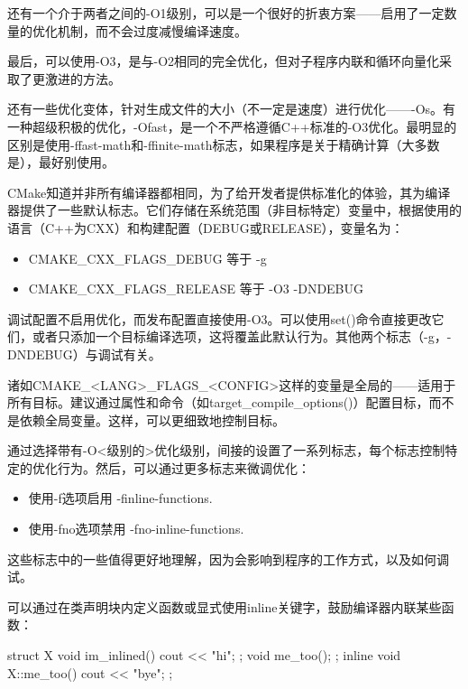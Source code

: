 还有一个介于两者之间的-O1级别，可以是一个很好的折衷方案——启用了一定数量的优化机制，而不会过度减慢编译速度。

最后，可以使用-O3，是与-O2相同的完全优化，但对子程序内联和循环向量化采取了更激进的方法。

还有一些优化变体，针对生成文件的大小（不一定是速度）进行优化——-Os。有一种超级积极的优化，-Ofast，是一个不严格遵循C++标准的-O3优化。最明显的区别是使用-ffast-math和-ffinite-math标志，如果程序是关于精确计算（大多数是），最好别使用。

CMake知道并非所有编译器都相同，为了给开发者提供标准化的体验，其为编译器提供了一些默认标志。它们存储在系统范围（非目标特定）变量中，根据使用的语言（C++为CXX）和构建配置（DEBUG或RELEASE），变量名为：

\begin{itemize}
\item
CMAKE\_CXX\_FLAGS\_DEBUG 等于 -g

\item
CMAKE\_CXX\_FLAGS\_RELEASE 等于 -O3 -DNDEBUG
\end{itemize}

调试配置不启用优化，而发布配置直接使用-O3。可以使用set()命令直接更改它们，或者只添加一个目标编译选项，这将覆盖此默认行为。其他两个标志（-g，-DNDEBUG）与调试有关。

诸如CMAKE\_<LANG>\_FLAGS\_<CONFIG>这样的变量是全局的——适用于所有目标。建议通过属性和命令（如target\_compile\_options()）配置目标，而不是依赖全局变量。这样，可以更细致地控制目标。

通过选择带有-O<级别的>优化级别，间接的设置了一系列标志，每个标志控制特定的优化行为。然后，可以通过更多标志来微调优化：

\begin{itemize}
\item
使用-f选项启用 -finline-functions.

\item
使用-fno选项禁用 -fno-inline-functions.
\end{itemize}

这些标志中的一些值得更好地理解，因为会影响到程序的工作方式，以及如何调试。


可以通过在类声明块内定义函数或显式使用inline关键字，鼓励编译器内联某些函数：

\begin{cpp}
struct X {
    void im_inlined(){ cout << "hi\n"; };
    void me_too();
};
inline void X::me_too() { cout << "bye\n"; };
\end{cpp}

